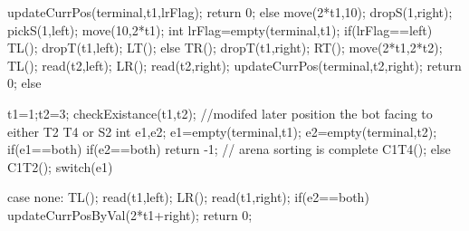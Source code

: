 {{{{{{                    	updateCurrPos(terminal,t1,lrFlag);
                    }
                    return 0;
                }
            }
            else
            {
                move(2*t1,10);
                dropS(1,right);
                pickS(1,left);
                move(10,2*t1);
                int lrFlag=empty(terminal,t1);
                if(lrFlag==left)
                {
                    TL();
                    dropT(t1,left);
                    LT();
                }
                else
                {
                    TR();
                    dropT(t1,right);
                    RT();
                }
                move(2*t1,2*t2);
                TL();
                read(t2,left);
                LR();
                read(t2,right);
                updateCurrPos(terminal,t2,right);
                return 0;
            }
        }
    }
    else
    {
        t1=1;t2=3;
        checkExistance(t1,t2); //modifed later position the bot facing to either T2 T4 or S2
        int e1,e2;
        e1=empty(terminal,t1);
        e2=empty(terminal,t2);
        if(e1==both)
        {
            if(e2==both)
            return -1; // arena sorting is complete
            C1T4();
        }
        else
            C1T2();
        switch(e1)
        {
            case none:
                TL();
                read(t1,left);
                LR();
                read(t1,right);
                if(e2==both)
                {
                    updateCurrPosByVal(2*t1+right);
                    return 0;
                }
                

}}}
